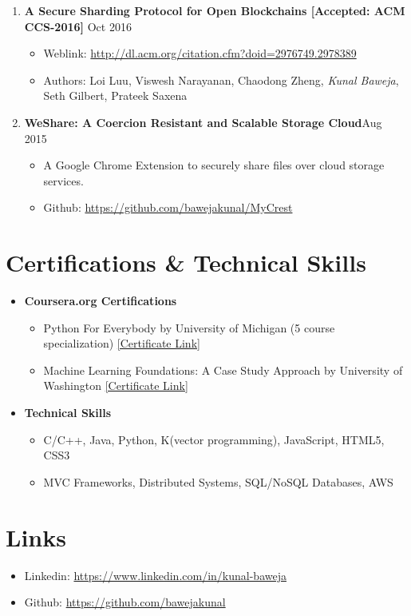 \documentclass{article}
\newcommand{\bi}{\vspace{-1mm}\begin{itemize}[align=left,leftmargin=*, labelindent=0pt,labelsep=2pt, label={-}, nosep]}
\newcommand{\ei}{\end{itemize}}
\begin{document}
\begin{enumerate}
    \item \textbf{A Secure Sharding Protocol for Open Blockchains [Accepted: ACM CCS-2016]} {\hfill Oct 2016}
    \bi
        \item Weblink: \href{http://dl.acm.org/citation.cfm?doid=2976749.2978389}{http://dl.acm.org/citation.cfm?doid=2976749.2978389}
        
        \item Authors: Loi Luu, Viswesh Narayanan, Chaodong Zheng, \textit{Kunal Baweja}, Seth Gilbert, Prateek Saxena
    \ei

    \item \textbf{WeShare: A Coercion Resistant and Scalable Storage Cloud}{\hfill Aug 2015}
    \bi
        \item A Google Chrome Extension to securely share files over cloud storage services.
        \item Github: \href{https://github.com/bawejakunal/MyCrest}{https://github.com/bawejakunal/MyCrest}
    \ei

\end{enumerate}


\section*{Certifications \& Technical Skills}
\begin{itemize}
    \item \textbf{Coursera.org Certifications}
    \bi
        \item Python For Everybody by University of Michigan (5 course specialization) \href{https://www.coursera.org/account/accomplishments/specialization/2B5PCJGZ9WEE}{[Certificate Link]}

        \item Machine Learning Foundations: A Case Study Approach by University of Washington \href{https://www.coursera.org/account/accomplishments/certificate/NDVXWMCYKX9N}{[Certificate Link]}
    \ei

    \item \textbf{Technical Skills}
    \bi
        \item C/C++, Java, Python, K(vector programming), JavaScript, HTML5, CSS3
        \item MVC Frameworks, Distributed Systems, SQL/NoSQL Databases, AWS
    \ei
\end{itemize}

\section*{Links}
\begin{itemize}[nosep]
    \item Linkedin: \href{https://www.linkedin.com/in/kunal-baweja}{https://www.linkedin.com/in/kunal-baweja}
    \item Github: \href{https://github.com/bawejakunal}{https://github.com/bawejakunal}
\end{itemize}
\end{document}
